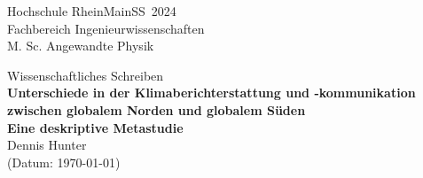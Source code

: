 \documentclass[%
fontsize=10,%
onecolumn,%
parskip=false,%
BCOR=0pt,%
DIV=15,%
overfullrule=true,%
titlepage=false,%
]{scrartcl}
\begin{document}
\begin{flushleft}
{\Large Hochschule RheinMain\hfill SS~2024\\}Fachbereich Ingenieurwissenschaften\\M. Sc. Angewandte Physik
\end{flushleft}
\vspace{2\baselineskip}
{%
\centering
{\Large Wissenschaftliches Schreiben\\}
\vspace{2\baselineskip}
{\huge \textbf{Unterschiede in der Klimaberichterstattung und -kommunikation zwischen globalem Norden und globalem Süden}\\}
\vspace{\baselineskip}
{\Large \textbf{Eine deskriptive Metastudie}\\}
\vspace{2\baselineskip}
{\large Dennis Hunter\\(Datum: \today)\\}
\vspace{1\baselineskip}
}

\vspace{\baselineskip}
\begin{multicols}{2}
    
\end{multicols}
\newpage
\printbibliography%
\end{document}

